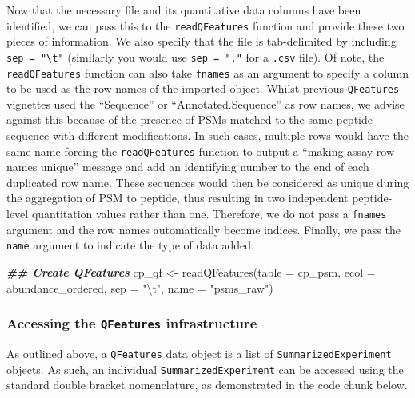 \documentclass[9pt,a4paper,]{extarticle}
\newenvironment{Shaded}{\begin{snugshade}}{\end{snugshade}}
\newcommand{\AttributeTok}[1]{\textcolor[rgb]{0.77,0.63,0.00}{#1}}
\newcommand{\DocumentationTok}[1]{\textcolor[rgb]{0.56,0.35,0.01}{\textbf{\textit{#1}}}}
\newcommand{\FunctionTok}[1]{\textcolor[rgb]{0.00,0.00,0.00}{#1}}
\newcommand{\NormalTok}[1]{#1}
\newcommand{\OtherTok}[1]{\textcolor[rgb]{0.56,0.35,0.01}{#1}}
\newcommand{\SpecialCharTok}[1]{\textcolor[rgb]{0.00,0.00,0.00}{#1}}
\newcommand{\StringTok}[1]{\textcolor[rgb]{0.31,0.60,0.02}{#1}}
\begin{document}
Now that the necessary file and its quantitative data columns have been
identified, we can pass this to the \texttt{readQFeatures} function and provide these
two pieces of information. We also specify that the file is tab-delimited by
including \texttt{sep\ =\ "\textbackslash{}t"} (similarly you would use \texttt{sep\ =\ ","} for a \texttt{.csv} file).
Of note, the \texttt{readQFeatures} function can also take \texttt{fnames} as an argument to
specify a column to be used as the row names of the imported object. Whilst
previous \texttt{QFeatures} vignettes used the ``Sequence'' or ``Annotated.Sequence'' as
row names, we advise against this because of the presence of PSMs matched to the
same peptide sequence with different modifications. In such cases, multiple rows
would have the same name forcing the \texttt{readQFeatures} function to output a
``making assay row names unique'' message and add an identifying number to the end
of each duplicated row name. These sequences would then be considered as unique
during the aggregation of PSM to peptide, thus resulting in two independent
peptide- level quantitation values rather than one. Therefore, we do not pass a
\texttt{fnames} argument and the row names automatically become indices. Finally, we
pass the \texttt{name} argument to indicate the type of data added.

\begin{Shaded}
\begin{Highlighting}[]
\DocumentationTok{\#\# Create QFeatures }
\NormalTok{cp\_qf }\OtherTok{\textless{}{-}} \FunctionTok{readQFeatures}\NormalTok{(}\AttributeTok{table =}\NormalTok{ cp\_psm,}
                       \AttributeTok{ecol =}\NormalTok{ abundance\_ordered,}
                       \AttributeTok{sep =} \StringTok{"}\SpecialCharTok{\textbackslash{}t}\StringTok{"}\NormalTok{,}
                       \AttributeTok{name =} \StringTok{"psms\_raw"}\NormalTok{)}
\end{Highlighting}
\end{Shaded}

\hypertarget{accessing-the-qfeatures-infrastructure}{%
\subsubsection{\texorpdfstring{Accessing the \texttt{QFeatures} infrastructure}{Accessing the QFeatures infrastructure}}\label{accessing-the-qfeatures-infrastructure}}

As outlined above, a \texttt{QFeatures} data object is a list of \texttt{SummarizedExperiment}
objects. As such, an individual \texttt{SummarizedExperiment} can be accessed using
the standard double bracket nomenclature, as demonstrated in the code chunk
below.
\end{document}

